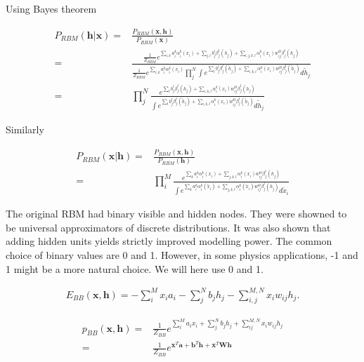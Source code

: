 \documentclass[%
oneside,                 %
final,                   %
10pt]{article}
\begin{document}
Using Bayes theorem

\begin{align}
	P_{RBM} (\bm{h}|\bm{x}) =& \frac{P_{RBM} (\bm{x}, \bm{h})}{P_{RBM} (\bm{x})} \nonumber \\
	=& \frac{\frac{1}{Z_{RBM}} e^{\sum_{i, k} a_i^k \alpha_i^k (x_i)
	+ \sum_{j, l} b_j^l \beta_j^l (h_j) 
	+ \sum_{i,j,k,l} \alpha_i^k (x_i) w_{ij}^{kl} \beta_j^l (h_j)}}
	{\frac{1}{Z_{RBM}} e^{\sum_{i, k} a_i^k \alpha_i^k (x_i)}
	\prod_j^N \int e^{\sum_l b_j^l \beta_j^l (\tilde{h}_j) + \sum_{i,k,l} \alpha_i^k (x_i) w_{ij}^{kl} \beta_j^l (\tilde{h}_j)}  d\tilde{h}_j} \nonumber \\
	=& \prod_j^N \frac{e^{\sum_l b_j^l \beta_j^l (h_j) + \sum_{i,k,l} \alpha_i^k (x_i) w_{ij}^{kl} \beta_j^l (h_j)} }
	{\int e^{\sum_l b_j^l \beta_j^l (\tilde{h}_j) + \sum_{i,k,l} \alpha_i^k (x_i) w_{ij}^{kl} \beta_j^l (\tilde{h}_j)}  d\tilde{h}_j}
\end{align}

Similarly

\begin{align}
	P_{RBM} (\bm{x}|\bm{h}) =&  \frac{P_{RBM} (\bm{x}, \bm{h})}{P_{RBM} (\bm{h})} \nonumber \\
	=& \prod_i^M \frac{e^{\sum_k a_i^k \alpha_i^k (x_i)
	+ \sum_{j,k,l} \alpha_i^k (x_i) w_{ij}^{kl} \beta_j^l (h_j)}}
	{\int e^{\sum_k a_i^k \alpha_i^k (\tilde{x}_i)
	+ \sum_{j,k,l} \alpha_i^k (\tilde{x}_i) w_{ij}^{kl} \beta_j^l (h_j)} d\tilde{x}_i}
\end{align}

The original RBM had binary visible and hidden nodes. They were
showned to be universal approximators of discrete distributions.
It was also shown that adding hidden units yields
strictly improved modelling power. The common choice of binary values
are 0 and 1. However, in some physics applications, -1 and 1 might be
a more natural choice. We will here use 0 and 1.

\begin{align}
	E_{BB}(\bm{x}, \mathbf{h}) = - \sum_i^M x_i a_i- \sum_j^N b_j h_j - \sum_{i,j}^{M,N} x_i w_{ij} h_j.
\end{align}

\begin{align}
	p_{BB}(\bm{x}, \bm{h}) =& \frac{1}{Z_{BB}} e^{\sum_i^M a_i x_i + \sum_j^N b_j h_j + \sum_{ij}^{M,N} x_i w_{ij} h_j} \\
	=& \frac{1}{Z_{BB}} e^{\bm{x}^T \bm{a} + \bm{b}^T \bm{h} + \bm{x}^T \bm{W} \bm{h}}
\end{align}
\end{document}
